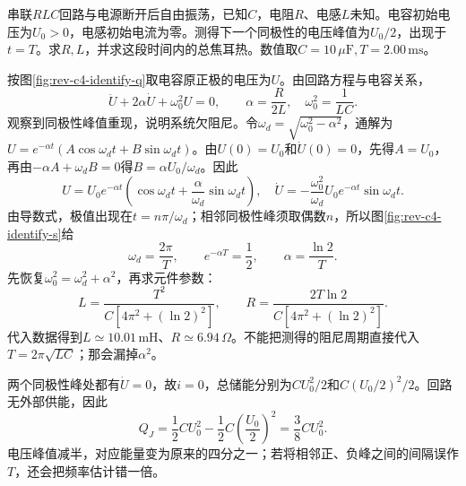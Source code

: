 \begin{exercise}[由衰减峰值反求串联电路参数]\label{ex:rev-c4-identify}
串联$RLC$回路与电源断开后自由振荡，已知$C$，电阻$R$、电感$L$未知。电容初始电压为$U_0>0$，电感初始电流为零。测得下一个同极性的电压峰值为$U_0/2$，出现于$t=T$。求$R,L$，并求这段时间内的总焦耳热。数值取$C=10\,\mu\mathrm F,T=2.00\,\mathrm{ms}$。
\end{exercise}
\begin{solution}
按图\ref{fig:rev-c4-identify-q}取电容原正极的电压为$U$。由回路方程与电容关系，
\[
 \ddot U+2\alpha\dot U+\omega_0^2U=0,\qquad
 \alpha=\frac{R}{2L},\quad\omega_0^2=\frac1{LC}.
\]
观察到同极性峰值重现，说明系统欠阻尼。令$\omega_d=\sqrt{\omega_0^2-\alpha^2}$，通解为$U=e^{-\alpha t}(A\cos\omega_dt+B\sin\omega_dt)$。由$U(0)=U_0$和$\dot U(0)=0$，先得$A=U_0$，再由$-\alpha A+\omega_dB=0$得$B=\alpha U_0/\omega_d$。因此
\[
 U=U_0e^{-\alpha t}\left(\cos\omega_dt+\frac\alpha{\omega_d}\sin\omega_dt\right),\quad
 \dot U=-\frac{\omega_0^2}{\omega_d}U_0e^{-\alpha t}\sin\omega_dt.
\]
由导数式，极值出现在$t=n\pi/\omega_d$；相邻同极性峰须取偶数$n$，所以图\ref{fig:rev-c4-identify-s}给
\[
 \omega_d=\frac{2\pi}{T},\qquad e^{-\alpha T}=\frac12,
 \qquad\alpha=\frac{\ln2}{T}.
\]
先恢复$\omega_0^2=\omega_d^2+\alpha^2$，再求元件参数：
\[
 \boxed{L=\frac{T^2}{C[4\pi^2+(\ln2)^2]},\qquad
 R=\frac{2T\ln2}{C[4\pi^2+(\ln2)^2]}}.
\]
代入数据得到$L\simeq10.01\,\mathrm{mH}$、$R\simeq6.94\,\Omega$。不能把测得的阻尼周期直接代入$T=2\pi\sqrt{LC}$；那会漏掉$\alpha^2$。

两个同极性峰处都有$\dot U=0$，故$i=0$，总储能分别为$CU_0^2/2$和$C(U_0/2)^2/2$。回路无外部供能，因此
\[
 Q_J=\frac12CU_0^2-\frac12C\left(\frac{U_0}2\right)^2
 =\frac38CU_0^2.
\]
电压峰值减半，对应能量变为原来的四分之一；若将相邻正、负峰之间的间隔误作$T$，还会把频率估计错一倍。
\end{solution}

